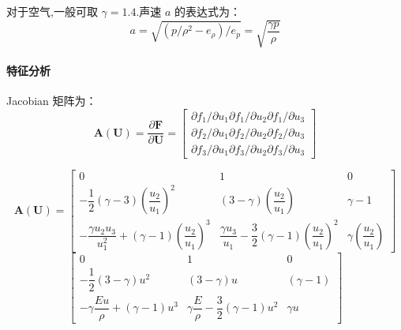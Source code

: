\documentclass{book}
\begin{document}
\begin{example}
\begin{example}{}{}
\begin{example}
\begin{example}
\begin{example}
对于空气,一般可取 $\gamma=1.4$.声速 $a$ 的表达式为：
\begin{equation}
    a=\sqrt{\left(p / \rho^{2}-e_{\rho}\right) / e_{p}}=\sqrt{\dfrac{\gamma p}{\rho}}
\end{equation}

\paragraph{特征分析}
Jacobian 矩阵为：
\begin{equation}
    \mathbf{A}(\mathbf{U})=\dfrac{\partial \mathbf{F}}{\partial \mathbf{U}}=\left[\begin{array}{l}
            \partial f_{1} / \partial u_{1} \partial f_{1} / \partial u_{2} \partial f_{1} / \partial u_{3} \\
            \partial f_{2} / \partial u_{1} \partial f_{2} / \partial u_{2} \partial f_{2} / \partial u_{3} \\
            \partial f_{3} / \partial u_{1} \partial f_{3} / \partial u_{2} \partial f_{3} / \partial u_{3}
        \end{array}\right]
\end{equation}

\begin{equation}
    \mathbf{A}(\mathbf{U})=\begin{bmatrix}
        0                                                                                      & 1                                                                                       & 0                                       \\
        -\dfrac{1}{2}(\gamma-3)\left(\dfrac{u_{2}}{u_{1}}\right)^{2}                           & (3-\gamma)\left(\dfrac{u_{2}}{u_{1}}\right)                                             & \gamma-1                                \\
        -\dfrac{\gamma u_{2} u_{3}}{u_{1}^{2}}+(\gamma-1)\left(\dfrac{u_{2}}{u_{1}}\right)^{3} & \dfrac{\gamma u_{3}}{u_{1}}-\dfrac{3}{2}(\gamma-1)\left(\dfrac{u_{2}}{u_{1}}\right)^{2} & \gamma\left(\dfrac{u_{2}}{u_{1}}\right)
    \end{bmatrix}
\end{equation}
\begin{equation}
    \begin{bmatrix}
        0                                          & 1                                                   & 0          \\
        -\dfrac{1}{2}(3-\gamma) u^{2}              & (3-\gamma) u                                        & (\gamma-1) \\
        -\gamma \dfrac{E u}{\rho}+(\gamma-1) u^{3} & \gamma \dfrac{E}{\rho}-\dfrac{3}{2}(\gamma-1) u^{2} & \gamma u
    \end{bmatrix}
\end{equation}


\end{example}
\end{example}
\end{example}
\end{example}
\end{example}
\end{document}
